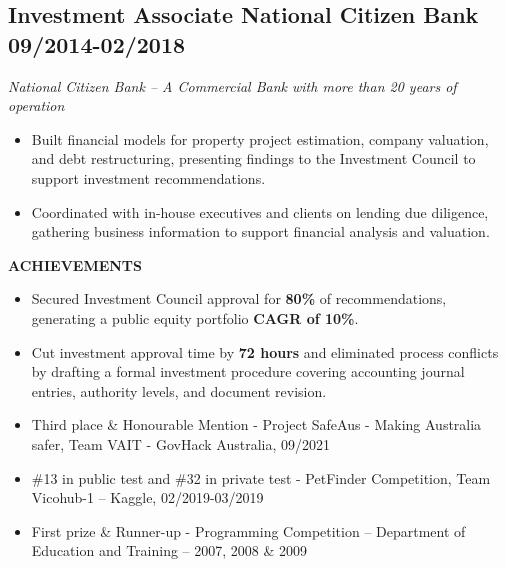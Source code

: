 \documentclass[11pt,a4paper]{article}
\newcommand{\linesection}[1]{%
  \vspace{10pt}%
  \noindent{\color{headerblue}\large\bfseries #1}\hspace{0.5em}{\color{sectionline}\leavevmode\leaders\hrule height 1.5pt\hfill\kern0pt}%
  \par\vspace{8pt}%
}
\begin{document}
\begin{mdframed}[style=dashedleft]
\subsection*{Investment Associate \hfill \textbf{National Citizen Bank} \hfill 09/2014-02/2018}
\textit{National Citizen Bank -- A Commercial Bank with more than 20 years of operation}

\begin{itemize}[leftmargin=1.5em, itemsep=4pt]
    \item Built financial models for property project estimation, company valuation, and debt restructuring, presenting findings to the Investment Council to support investment recommendations.
    \item Coordinated with in-house executives and clients on lending due diligence, gathering business information to support financial analysis and valuation.
\end{itemize}

\textbf{ACHIEVEMENTS}
\begin{itemize}[leftmargin=1.5em, itemsep=4pt]
    \item Secured Investment Council approval for \textbf{80\%} of recommendations, generating a public equity portfolio \textbf{CAGR of 10\%}.
    \item Cut investment approval time by \textbf{72 hours} and eliminated process conflicts by drafting a formal investment procedure covering accounting journal entries, authority levels, and document revision.
\end{itemize}

\end{mdframed}

\vspace{6pt}

\linesection{HONOURS \& AWARDS}
\begin{mdframed}[style=dashedleft]
\begin{itemize}[leftmargin=1.5em, itemsep=4pt]
    \item Third place \& Honourable Mention - Project SafeAus - Making Australia safer, Team VAIT - GovHack Australia, 09/2021
    \item \#13 in public test and \#32 in private test - PetFinder Competition, Team Vicohub-1 -- Kaggle, 02/2019-03/2019
    \item First prize \& Runner-up - Programming Competition -- Department of Education and Training -- 2007, 2008 \& 2009
\end{itemize}
\end{mdframed}
\end{document}
